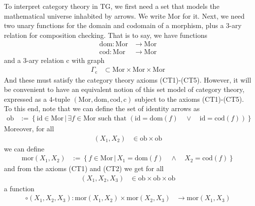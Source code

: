 \nocite{53fd7d7e}
To interpret category theory in TG, we first need a set that models the mathematical universe inhabited by arrows.
We write $\mathrm{Mor}$ for it.
Next, we need two unary functions for the domain and codomain of a morphism, plus a $3$-ary relation for composition checking.
That is to say, we have functions
\begin{align*}
  \mathrm{dom}
  \colon
  \mathrm{Mor}
  &\rightarrow
  \mathrm{Mor}
  \\
  \mathrm{cod}
  \colon
  \mathrm{Mor}
  &\rightarrow
  \mathrm{Mor}
\end{align*}
and a $3$-ary relation $\mathrm{c}$ with graph
\begin{align*}
  \Gamma_{\mathrm{c}}
  &\subset
  \mathrm{Mor}
  \times
  \mathrm{Mor}
  \times
  \mathrm{Mor}
\end{align*}
And these must satisfy the category theory axioms (CT1)-(CT5).
However, it will be convenient to have an equivalent notion of this set model of category theory, expressed as a $4$-tuple $(\mathrm{Mor},\mathrm{dom},\mathrm{cod},\mathrm{c})$ subject to the axioms (CT1)-(CT5).
To this end, note that we can define the set of identity arrows as
\begin{align*}
  \mathrm{ob}
  &:=
  \left\lbrace
      \mathrm{id}
      \in
      \mathrm{Mor}
    \,
    \vert
    \,
      \exists
      f
      \in
      \mathrm{Mor}
      \text{ such that }
      \left(
        \mathrm{id}
        =
        \mathrm{dom}(f)
        \quad
        \lor
        \quad
        \mathrm{id}
        =
        \mathrm{cod}(f)
      \right)
  \right\rbrace
\end{align*}
Moreover, for all
\begin{align*}
  (X_{1},X_{2})
  &\in
  \mathrm{ob}
  \times
  \mathrm{ob}
\end{align*}
we can define
\begin{align*}
  \mathrm{mor}(X_{1},X_{2})
  &:=
  \left\lbrace
      f
      \in
      \mathrm{Mor}
    \,
    \vert
    \,
      X_{1}
      =
      \mathrm{dom}(f)
      \quad
      \land
      \quad
      X_{2}
      =
      \mathrm{cod}(f)
  \right\rbrace
\end{align*}
and from the axioms (CT1) and (CT2) we get for all
\begin{align*}
  (X_{1},X_{2},X_{3})
  &\in
  \mathrm{ob}
  \times
  \mathrm{ob}
  \times
  \mathrm{ob}
\end{align*}
a function
\begin{align*}
  \circ(X_{1},X_{2},X_{3})
  \colon
  \mathrm{mor}(X_{1},X_{2})
  \times
  \mathrm{mor}(X_{2},X_{3})
  &\rightarrow
  \mathrm{mor}(X_{1},X_{3})
\end{align*}
